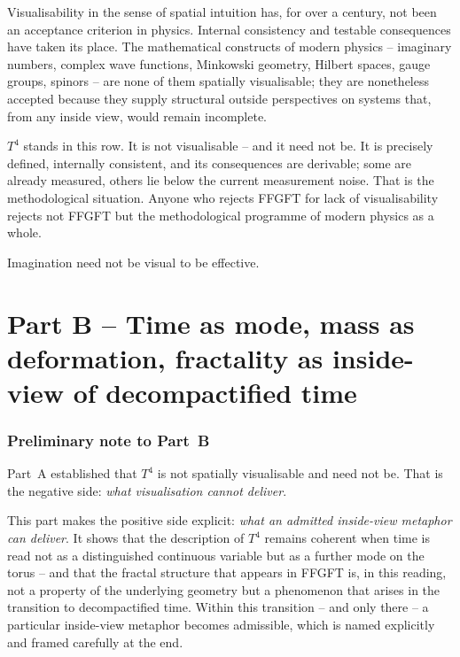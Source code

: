 Visualisability in the sense of spatial intuition has, for over a
century, not been an acceptance criterion in physics. Internal
consistency and testable consequences have taken its place. The
mathematical constructs of modern physics -- imaginary numbers,
complex wave functions, Minkowski geometry, Hilbert spaces, gauge
groups, spinors -- are none of them spatially visualisable; they are
nonetheless accepted because they supply structural outside
perspectives on systems that, from any inside view, would remain
incomplete.

$T^4$ stands in this row. It is not visualisable -- and it need not
be. It is precisely defined, internally consistent, and its
consequences are derivable; some are already measured, others lie
below the current measurement noise. That is the methodological
situation. Anyone who rejects FFGFT for lack of visualisability
rejects not FFGFT but the methodological programme of modern physics
as a whole.

Imagination need not be visual to be effective.



\part*{Part B -- Time as mode, mass as deformation, fractality as inside-view of decompactified time}

\section*{Preliminary note to Part~B}

Part~A established that $T^4$ is not spatially visualisable and need
not be. That is the negative side: \emph{what visualisation cannot
deliver}.

This part makes the positive side explicit: \emph{what an admitted
inside-view metaphor can deliver}. It shows that the description of
$T^4$ remains coherent when time is read not as a distinguished
continuous variable but as a further mode on the torus -- and that
the fractal structure that appears in FFGFT is, in this reading, not
a property of the underlying geometry but a phenomenon that arises in
the transition to decompactified time. Within this transition -- and
only there -- a particular inside-view metaphor becomes admissible,
which is named explicitly and framed carefully at the end.

